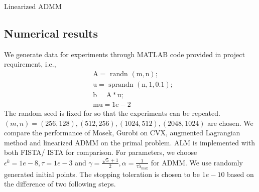 \documentclass{article}
\begin{document}
\begin{algorithm}[H]
\caption{Linearized ADMM}
\begin{algorithmic}[1]\label{alg:linear admm}
\ENDWHILE
{}
\end{algorithmic}
\end{algorithm}
\subsection{Numerical results}
We generate data for experiments through MATLAB code provided in project requirement, i.e., 
$$
\begin{aligned}
	&\mathrm{A}=\text { randn }(\mathrm{m}, \mathrm{n}) ; \\
	&\mathrm{u}=\text { sprandn }(\mathrm{n}, 1,0.1) ; \\
	&\mathrm{b}=\mathrm{A} * \mathrm{u} ; \\
	&\mathrm{mu}=1 \mathrm{e}-2
\end{aligned}
$$
The random seed is fixed for so that the experiments can be repeated. $(m,n)=(256,128),(512,256),(1024,512),(2048,1024)$ are chosen. We compare the performance of Mosek, Gurobi on CVX, augmented Lagrangian method and linearized ADMM on the primal problem. ALM is implemented with both FISTA/ ISTA for comparison. For parameters, we choose $\epsilon^k=1e-8,\tau=1e-3$ and $\gamma=\frac{\sqrt{5}+1}{2},\alpha=\frac{1}{\tau\lambda_{\max}}$ for ADMM. We use randomly generated initial points. The stopping toleration is chosen to be $1e-10$ based on the difference of two following steps.
\end{document}

